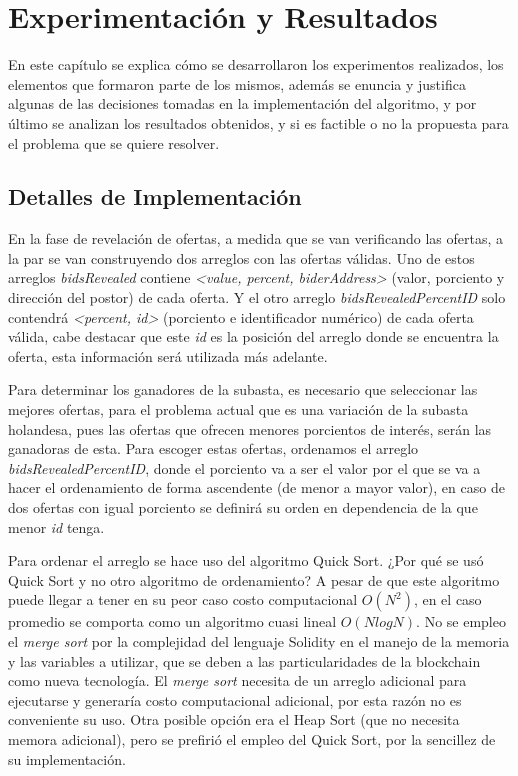 \chapter{Experimentación y Resultados}\label{chapter:implementation}
  En este capítulo se explica cómo se desarrollaron los experimentos realizados, los elementos que formaron 
  parte de los mismos, además se enuncia y justifica algunas de las decisiones tomadas en la implementación
  del algoritmo, y por último se analizan los resultados obtenidos, y si es factible o no la propuesta
  para el problema que se quiere resolver.

  \section{Detalles de Implementación}
    En la fase de revelación de ofertas, a medida que se van verificando las ofertas, a la par se van
    construyendo dos arreglos con las ofertas válidas. Uno de estos arreglos \textit{bidsRevealed} contiene 
    \textit{<value, percent, biderAddress>} (valor, porciento y dirección del postor) de cada oferta. Y
    el otro arreglo \textit{bidsRevealedPercentID} solo contendrá \textit{<percent, id>} (porciento e 
    identificador numérico) de cada oferta válida, cabe destacar que este \textit{id} es la posición del
    arreglo donde se encuentra la oferta, esta información será utilizada más adelante.

    Para determinar los ganadores de la subasta, es necesario que seleccionar las mejores ofertas, para el
    problema actual que es una variación de la subasta holandesa, pues las ofertas que ofrecen menores
    porcientos de interés, serán las ganadoras de esta. Para escoger estas ofertas, ordenamos el arreglo
    \textit{bidsRevealedPercentID}, donde el porciento va a ser el valor por el que se va a hacer el 
    ordenamiento de forma ascendente (de menor a mayor valor), en caso de dos ofertas con igual porciento
    se definirá su orden en dependencia de la que menor \textit{id} tenga.

    Para ordenar el arreglo se hace uso del algoritmo Quick Sort. ¿Por qué se usó Quick Sort y no otro 
    algoritmo de ordenamiento? A pesar de que este algoritmo puede llegar a tener en su peor caso costo
    computacional $O(N^2)$, en el caso promedio se comporta como un algoritmo cuasi lineal $O(N log N)$.
    No se empleo el \textit{merge sort} por la complejidad del lenguaje Solidity en el manejo de la memoria
    y las variables a utilizar, que se deben a las particularidades de la blockchain como nueva tecnología.
    El \textit{merge sort} necesita de un arreglo adicional para ejecutarse y generaría costo 
    computacional adicional, por esta razón no es conveniente su uso. Otra posible opción era el Heap Sort 
    (que no necesita memora adicional), pero 
    se prefirió el empleo del Quick Sort, por la sencillez de su implementación.

